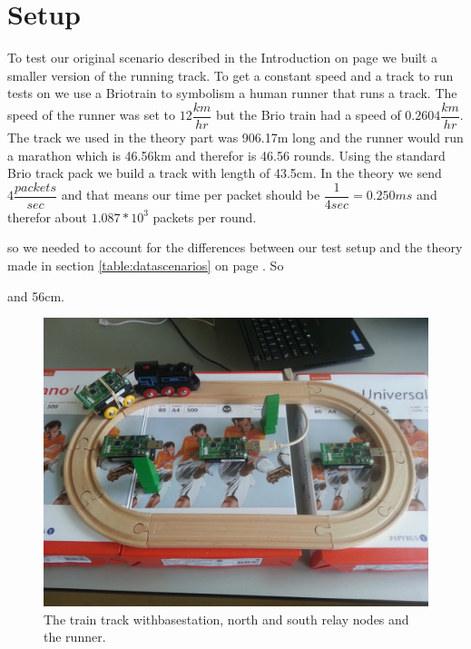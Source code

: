 \section{Setup}\label{sc:setup}
To test our original scenario described in the Introduction on page \pageref{ch:introduction} we built a smaller version of the running track. To get a constant speed and a track to run tests on we use a Brio\texttrademark train to symbolism a human runner that runs a track. The speed of the runner was set to $12\dfrac{km}{hr}$ but the Brio train had a speed of $0.2604\dfrac{km}{hr}$. The track we used in the theory part was 906.17m long and the runner would run a marathon which is 46.56km and therefor is 46.56 rounds. Using the standard Brio track pack we build a track with length of 43.5cm. In the theory we send $4\dfrac{packets}{sec}$ and that means our time per packet should be $\dfrac{1}{4sec} = 0.250ms$ and therefor about $ 1.087*10^3$ packets per round. 

 so we needed to account for the differences between our test setup and the theory made in section \ref{table:datascenarios} on page \pageref{table:scenarios}. So 





 and 56cm. 


\begin{figure}[H]
	\centering
	\includegraphics[width=1\linewidth]{testAndPerformance/setup/setup}
	\caption{The train track withbasestation, north and south relay nodes and the runner. }
	\label{fig:testSetup}
\end{figure}

